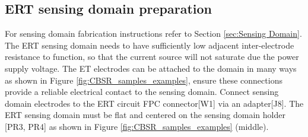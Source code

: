 \subsection{ERT sensing domain preparation}
For sensing domain fabrication instructions refer to Section \ref{sec:Sensing Domain}. The ERT sensing domain needs to have sufficiently low adjacent inter-electrode resistance to function, so that the current source will not saturate due the power supply voltage. The ET electrodes can be attached to the domain in many ways as shown in Figure \ref{fig:CBSR_samples_examples}, ensure these connections provide a reliable electrical contact to the sensing domain. Connect sensing domain electrodes to the ERT circuit FPC connector[W1] via an adapter[J8]. The ERT sensing domain must be flat and centered on the sensing domain holder [PR3, PR4] as shown in Figure \ref{fig:CBSR_samples_examples} (middle). 


